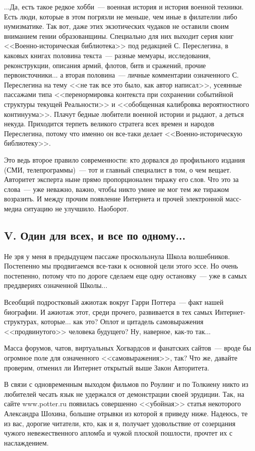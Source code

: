 \documentclass{scrbook}
\newcommand{\flqq}{<<}
\newcommand{\frqq}{>>}
\newcommand{\mdash}{~--- }
\newcommand{\essaysection}[1]{\subsection*{#1}\nopagebreak}
\begin{document}
...Да, есть такое редкое хобби{\mdash}военная история и история военной техники. Есть люди, которые в этом погрязли не меньше, чем иные в филателии либо нумизматике. Так вот, даже этих экзотических чудаков не оставили своим вниманием гении образованщины. Специально для них выходит серия книг {\flqq}Военно-историческая библиотека{\frqq} под редакцией С. Переслегина, в каковых книгах половина текста{\mdash}разные мемуары, исследования, реконструкции, описания армий, флотов, битв и сражений, прочие первоисточники... а вторая половина{\mdash}личные комментарии означенного С. Переслегина на тему {\flqq}не так все это было, как автор написал{\frqq}, усеянные пассажами типа {\flqq}перенормировка контекста при сохранении событийной структуры текущей Реальности{\frqq} и {\flqq}обобщенная калибровка вероятностного континуума{\frqq}. Плачут бедные любители военной истории и рыдают, а деться некуда. Приходится терпеть великого стратега всех времен и народов Переслегина, потому что именно он все-таки делает {\flqq}Военно-историческую библиотеку{\frqq}.

Это ведь второе правило современности: кто дорвался до профильного издания (СМИ, телепрограммы){\mdash}тот и главный специалист в том, о чем вещает. Авторитет эксперта ныне прямо пропорционален тиражу его слов. Что это за слова{\mdash}уже неважно, важно, чтобы никто умнее не мог тем же тиражом возразить. И между прочим появление Интернета и прочей электронной масс-медиа ситуацию не улучшило. Наоборот.

\essaysection{V. Один для всех, и все по одному...}

Не зря у меня в предыдущем пассаже проскользнула Школа волшебников. Постепенно мы продвигаемся все-таки к основной цели этого эссе. Но очень постепенно, потому что по дороге сделаем еще одну остановку{\mdash}уже в самых преддвериях означенной Школы...

Всеобщий подростковый ажиотаж вокруг Гарри Поттера{\mdash}факт нашей биографии. И ажиотаж этот, среди прочего, развивается в тех самых Интернет-структурах, которые... как это? Оплот и цитадель самовыражения {\flqq}продвинутого{\frqq} человека будущего? Ну, наверное, как-то так...

Масса форумов, чатов, виртуальных Хогвардсов и фанатских сайтов{\mdash}вроде бы огромное поле для означенного {\flqq}самовыражения{\frqq}, так? Что же, давайте проверим, отменил ли Интернет открытый выше Закон Авторитета.

В связи с одновременным выходом фильмов по Роулинг и по Толкиену никто из любителей чесать язык не удержался от демонстрации своей эрудиции. Так, на сайте www.potter.ru появилась совершенно {\flqq}убойная{\frqq} статья некоторого Александра Шохина, большие отрывки из которой я приведу ниже. Надеюсь, те из вас, дорогие читатели, кто, как и я, получает удовольствие от созерцания чужого невежественного апломба и чужой плоской пошлости, прочтет их с наслаждением.
\end{document}
